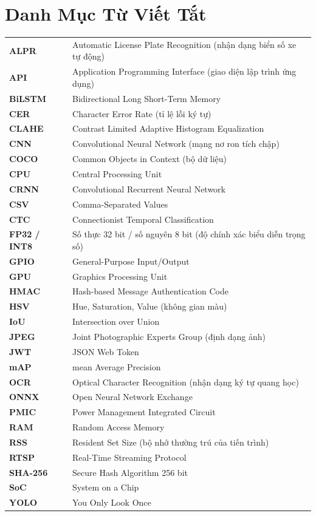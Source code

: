 \chapter*{Danh Mục Từ Viết Tắt}

\begin{longtable}{@{}p{2.6cm}p{11.5cm}@{}}
\textbf{ALPR} & Automatic License Plate Recognition (nhận dạng biển số xe tự động) \\
\textbf{API} & Application Programming Interface (giao diện lập trình ứng dụng) \\
\textbf{BiLSTM} & Bidirectional Long Short-Term Memory \\
\textbf{CER} & Character Error Rate (tỉ lệ lỗi ký tự) \\
\textbf{CLAHE} & Contrast Limited Adaptive Histogram Equalization \\
\textbf{CNN} & Convolutional Neural Network (mạng nơ ron tích chập) \\
\textbf{COCO} & Common Objects in Context (bộ dữ liệu) \\
\textbf{CPU} & Central Processing Unit \\
\textbf{CRNN} & Convolutional Recurrent Neural Network \\
\textbf{CSV} & Comma-Separated Values \\
\textbf{CTC} & Connectionist Temporal Classification \\
\textbf{FP32 / INT8} & Số thực 32 bit / số nguyên 8 bit (độ chính xác biểu diễn trọng số) \\
\textbf{GPIO} & General-Purpose Input/Output \\
\textbf{GPU} & Graphics Processing Unit \\
\textbf{HMAC} & Hash-based Message Authentication Code \\
\textbf{HSV} & Hue, Saturation, Value (không gian màu) \\
\textbf{IoU} & Intersection over Union \\
\textbf{JPEG} & Joint Photographic Experts Group (định dạng ảnh) \\
\textbf{JWT} & JSON Web Token \\
\textbf{mAP} & mean Average Precision \\
\textbf{OCR} & Optical Character Recognition (nhận dạng ký tự quang học) \\
\textbf{ONNX} & Open Neural Network Exchange \\
\textbf{PMIC} & Power Management Integrated Circuit \\
\textbf{RAM} & Random Access Memory \\
\textbf{RSS} & Resident Set Size (bộ nhớ thường trú của tiến trình) \\
\textbf{RTSP} & Real-Time Streaming Protocol \\
\textbf{SHA-256} & Secure Hash Algorithm 256 bit \\
\textbf{SoC} & System on a Chip \\
\textbf{YOLO} & You Only Look Once \\
\end{longtable}
